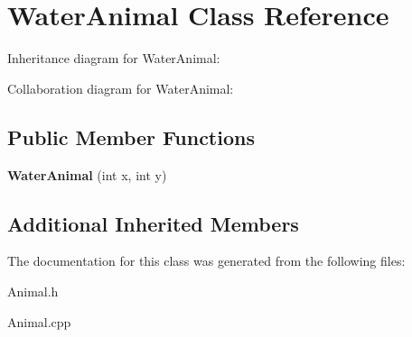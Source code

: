 \hypertarget{classWaterAnimal}{}\section{Water\+Animal Class Reference}
\label{classWaterAnimal}


Inheritance diagram for Water\+Animal\+:


Collaboration diagram for Water\+Animal\+:
\subsection*{Public Member Functions}
\begin{DoxyCompactItemize}
\item 
{\bfseries Water\+Animal} (int x, int y)\hypertarget{classWaterAnimal_ab11245c8547382631a6ae1053443ad72}{}\label{classWaterAnimal_ab11245c8547382631a6ae1053443ad72}

\end{DoxyCompactItemize}
\subsection*{Additional Inherited Members}


The documentation for this class was generated from the following files\+:\begin{DoxyCompactItemize}
\item 
Animal.\+h\item 
Animal.\+cpp\end{DoxyCompactItemize}
